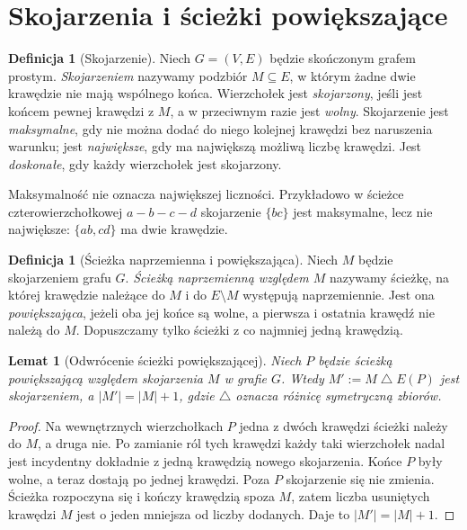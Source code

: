 \documentclass[11pt,a4paper]{report}
\numberwithin{equation}{section}
\theoremstyle{plain}
\newtheorem{lemat}[twierdzenie]{Lemat}
\theoremstyle{definition}
\newtheorem{definicja}[twierdzenie]{Definicja}
\theoremstyle{remark}
\begin{document}
\section{Skojarzenia i ścieżki powiększające}
\label{sec:tg-matchings}

\begin{definicja}[Skojarzenie]
Niech $G=(V,E)$ będzie skończonym grafem prostym.
\emph{Skojarzeniem} nazywamy podzbiór $M\subseteq E$,
w którym żadne dwie krawędzie nie mają wspólnego końca.
Wierzchołek jest \emph{skojarzony}, jeśli jest końcem
pewnej krawędzi z $M$, a w przeciwnym razie jest
\emph{wolny}. Skojarzenie jest \emph{maksymalne}, gdy
nie można dodać do niego kolejnej krawędzi bez
naruszenia warunku; jest \emph{największe}, gdy ma
największą możliwą liczbę krawędzi. Jest \emph{doskonałe},
gdy każdy wierzchołek jest skojarzony.
\end{definicja}

Maksymalność nie oznacza największej liczności.
Przykładowo w ścieżce czterowierzchołkowej $a-b-c-d$
skojarzenie $\{bc\}$ jest maksymalne, lecz nie największe:
$\{ab,cd\}$ ma dwie krawędzie.

\begin{definicja}[Ścieżka naprzemienna i powiększająca]
Niech $M$ będzie skojarzeniem grafu $G$. \emph{Ścieżką
naprzemienną względem $M$} nazywamy ścieżkę, na której
krawędzie należące do $M$ i do $E\setminus M$
występują naprzemiennie. Jest ona \emph{powiększająca},
jeżeli oba jej końce są wolne, a pierwsza i ostatnia
krawędź nie należą do $M$. Dopuszczamy tylko ścieżki
z co najmniej jedną krawędzią.
\end{definicja}

\begin{lemat}[Odwrócenie ścieżki powiększającej]
Niech $P$ będzie ścieżką powiększającą względem
skojarzenia $M$ w grafie $G$. Wtedy
$M':=M\mathbin{\triangle}E(P)$ jest skojarzeniem,
a $|M'|=|M|+1$, gdzie $\triangle$ oznacza różnicę
symetryczną zbiorów.
\end{lemat}

\begin{proof}
Na wewnętrznych wierzchołkach $P$ jedna z dwóch
krawędzi ścieżki należy do $M$, a druga nie.
Po zamianie ról tych krawędzi każdy taki wierzchołek
nadal jest incydentny dokładnie z jedną krawędzią
nowego skojarzenia. Końce $P$ były wolne,
a teraz dostają po jednej krawędzi. Poza $P$
skojarzenie się nie zmienia. Ścieżka rozpoczyna się
i kończy krawędzią spoza $M$, zatem liczba usuniętych
krawędzi $M$ jest o jeden mniejsza od liczby dodanych.
Daje to $|M'|=|M|+1$.
\end{proof}
\end{document}
